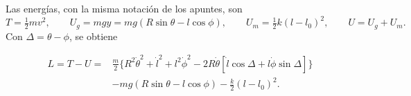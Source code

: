 \documentclass[11pt,a4paper]{article}
\begin{document}
Las energías, con la misma notación de los apuntes, son
\begin{equation}
 T=\tfrac12mv^2,\qquad U_g=mgy=mg(R\sin\theta-l\cos\phi),\qquad
 U_m=\tfrac12k(l-l_0)^2,\qquad U=U_g+U_m.
\end{equation}
Con $\Delta=\theta-\phi$, se obtiene
\begin{resultado}
\begin{equation}
\begin{aligned}
 L=T-U={}&\frac m2\{R^2\dot\theta^2+\dot l^2+l^2\dot\phi^2
 -2R\dot\theta[\dot l\cos\Delta+l\dot\phi\sin\Delta]\}\\
 &-mg(R\sin\theta-l\cos\phi)-\frac k2(l-l_0)^2.
\end{aligned}
\end{equation}
\end{resultado}

\newpage
\end{document}
